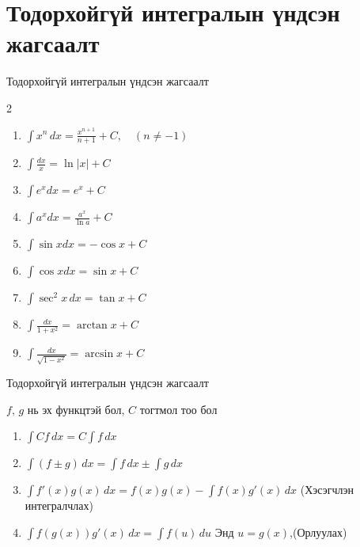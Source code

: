 \section{Тодорхойгүй интегралын үндсэн жагсаалт}
\begin{frame}[allowframebreaks]{Тодорхойгүй интегралын үндсэн жагсаалт}
\begin{multicols}{2}
\begin{enumerate}
\item $\displaystyle\int x^n\,dx = \frac{x^{n+1}}{n+1}+C,\quad (n\neq -1)$
\item $\displaystyle\int \frac{dx}{x}= \ln |x|+C$
\item $\displaystyle\int e^x dx = e^x +C $
\item $\displaystyle\int a^x dx = \frac{a^x}{\ln a}+C$
\item $\displaystyle\int \sin x dx = -\cos x + C $
\item $\displaystyle\int \cos x dx = \sin x + C$
\item $\displaystyle\int \sec^2 x\, dx = \tan x +C$ 
\item $\displaystyle\int \frac{dx}{1+x^2}= \arctan x + C$
\item $\displaystyle\int \frac{dx}{\sqrt{1-x^2}} = \arcsin x +C$
\end{enumerate}
\end{multicols}
\end{frame}

\begin{frame}[allowframebreaks]{Тодорхойгүй интегралын үндсэн жагсаалт}
\begin{theorem} $f, \, g$ нь эх функцтэй бол, $C$ тогтмол тоо бол
  \begin{enumerate}
  \item $\displaystyle \int Cf\,dx=C\displaystyle \int f\,dx$ 
\item $\displaystyle \int (f\pm g)\,dx = \int f\,dx \pm \int g\,dx$
\item $\displaystyle \int f'(x)g(x)\,dx = f(x)g(x) - \int f(x)g'(x)\,dx$ (Хэсэгчлэн интегралчлах)
\item $\displaystyle \int f(g(x))g'(x)\,dx = \int f(u)\,du$ Энд $u=g(x)$,\quad (Орлуулах)
  \end{enumerate}
\end{theorem}
\end{frame}

